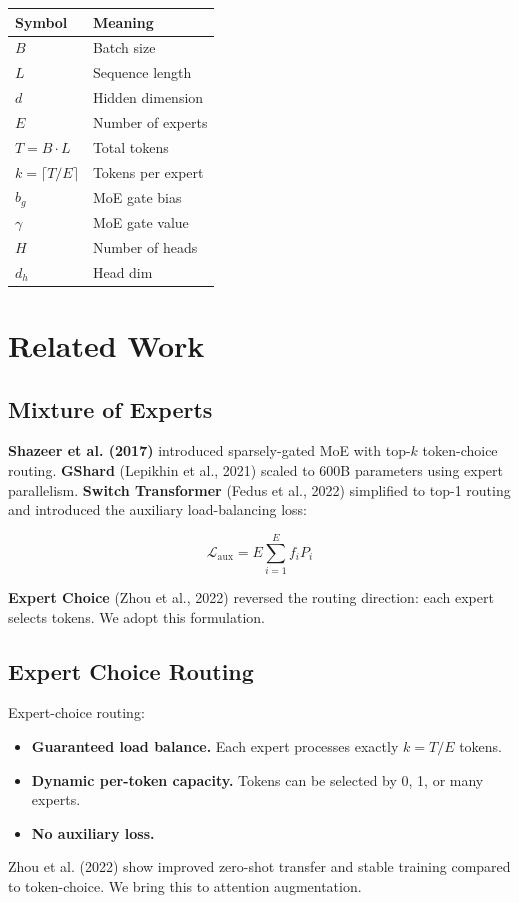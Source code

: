 \begin{table}[H]
\centering
\small
\begin{tabular}{ll}
\toprule
\textbf{Symbol} & \textbf{Meaning} \\
\midrule
$B$ & Batch size \\
$L$ & Sequence length \\
$d$ & Hidden dimension \\
$E$ & Number of experts \\
$T = B \cdot L$ & Total tokens \\
$k = \lceil T / E \rceil$ & Tokens per expert \\
$b_g$ & MoE gate bias \\
$\gamma$ & MoE gate value \\
$H$ & Number of heads \\
$d_h$ & Head dim \\
\bottomrule
\end{tabular}
\end{table}



\section{Related Work}

\subsection{Mixture of Experts}

\textbf{Shazeer et al. (2017)} introduced sparsely-gated MoE with top-$k$ 
token-choice routing. \textbf{GShard} (Lepikhin et al., 2021) scaled to 600B 
parameters using expert parallelism. \textbf{Switch Transformer} (Fedus et al., 
2022) simplified to top-1 routing and introduced the auxiliary 
load-balancing loss:

\[
\mathcal{L}_\text{aux} = E \sum_{i=1}^{E} f_i P_i
\tag{2.1}
\]

\textbf{Expert Choice} (Zhou et al., 2022) reversed the routing direction:
each expert selects tokens. We adopt this formulation.

\subsection{Expert Choice Routing}

Expert-choice routing:

\begin{itemize}
\item \textbf{Guaranteed load balance.} Each expert processes exactly $k = T / E$
  tokens.
\item \textbf{Dynamic per-token capacity.} Tokens can be selected by 0, 1, or many
  experts.
\item \textbf{No auxiliary loss.}

\end{itemize}
Zhou et al. (2022) show improved zero-shot transfer and stable training 
compared to token-choice. We bring this to attention augmentation.

